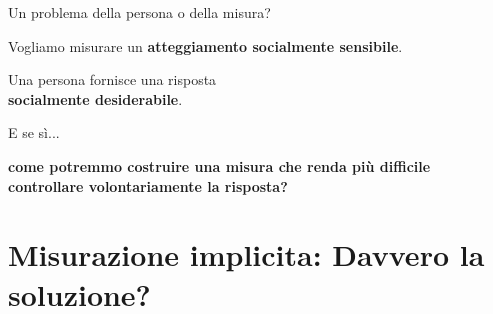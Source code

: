 \documentclass[compress]{beamer}
\begin{document}
\begin{frame}{Un problema della persona o della misura?}
	
	\begin{center}
		\large
		
		Vogliamo misurare un \textbf{atteggiamento socialmente sensibile}.
		
		\vspace{5mm}
		
		Una persona fornisce una risposta\\
		\textbf{socialmente desiderabile}.
		
		\vspace{7mm}
		
		
		\vspace{7mm}
		
		E se sì...
		
		\vspace{2mm}
		
		\textbf{come potremmo costruire una misura che renda più difficile\\
			controllare volontariamente la risposta?}
		
	\end{center}
	
\end{frame}

\section[Mis. implicita]{Misurazione implicita: Davvero la soluzione?}
\end{document}

